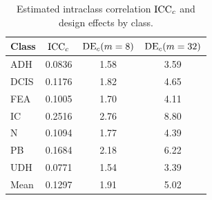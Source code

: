 \begin{table}[htbp]
\centering
\small
\begin{tabular}{lccc}
\toprule
Class & $\operatorname{ICC}_c$ & $\mathrm{DE}_c(m=8)$ & $\mathrm{DE}_c(m=32)$ \\
\midrule
ADH & 0.0836 & 1.58 & 3.59 \\
DCIS & 0.1176 & 1.82 & 4.65 \\
FEA & 0.1005 & 1.70 & 4.11 \\
IC & 0.2516 & 2.76 & 8.80 \\
N & 0.1094 & 1.77 & 4.39 \\
PB & 0.1684 & 2.18 & 6.22 \\
UDH & 0.0771 & 1.54 & 3.39 \\
\midrule
Mean & 0.1297 & 1.91 & 5.02 \\
\bottomrule
\end{tabular}
\caption{Estimated intraclass correlation $\operatorname{ICC}_c$ and design effects by class.}
\label{tab:breadth_class_iccs}
\end{table}

